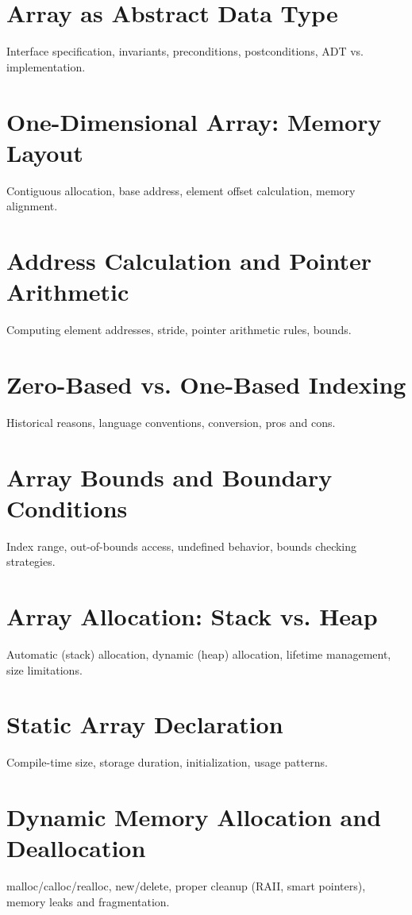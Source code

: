 \chapter{Array as Abstract Data Type}
Interface specification, invariants, preconditions, postconditions, ADT vs. implementation.

\chapter{One-Dimensional Array: Memory Layout}
Contiguous allocation, base address, element offset calculation, memory alignment.

\chapter{Address Calculation and Pointer Arithmetic}
Computing element addresses, stride, pointer arithmetic rules, bounds.

\chapter{Zero-Based vs. One-Based Indexing}
Historical reasons, language conventions, conversion, pros and cons.

\chapter{Array Bounds and Boundary Conditions}
Index range, out-of-bounds access, undefined behavior, bounds checking strategies.

\chapter{Array Allocation: Stack vs. Heap}
Automatic (stack) allocation, dynamic (heap) allocation, lifetime management, size limitations.

\chapter{Static Array Declaration}
Compile-time size, storage duration, initialization, usage patterns.

\chapter{Dynamic Memory Allocation and Deallocation}
malloc/calloc/realloc, new/delete, proper cleanup (RAII, smart pointers), memory leaks and fragmentation.

